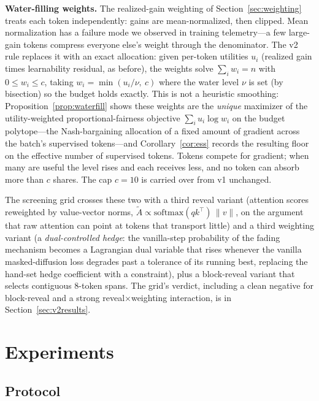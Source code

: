 \documentclass{article} %
\begin{document}
\textbf{Water-filling weights.} The realized-gain weighting of Section~\ref{sec:weighting} treats each token independently: gains are mean-normalized, then clipped. Mean normalization has a failure mode we observed in training telemetry---a few large-gain tokens compress everyone else's weight through the denominator. The v2 rule replaces it with an exact allocation: given per-token utilities $u_i$ (realized gain times learnability residual, as before), the weights solve $\sum_i w_i = n$ with $0 \le w_i \le c$, taking $w_i = \min(u_i/\nu,\ c)$ where the water level $\nu$ is set (by bisection) so the budget holds exactly. This is not a heuristic smoothing: Proposition~\ref{prop:waterfill} shows these weights are the \emph{unique} maximizer of the utility-weighted proportional-fairness objective $\sum_i u_i \log w_i$ on the budget polytope---the Nash-bargaining allocation of a fixed amount of gradient across the batch's supervised tokens---and Corollary~\ref{cor:ess} records the resulting floor on the effective number of supervised tokens. Tokens compete for gradient; when many are useful the level rises and each receives less, and no token can absorb more than $c$ shares. The cap $c{=}10$ is carried over from v1 unchanged.

The screening grid crosses these two with a third reveal variant (attention scores reweighted by value-vector norms, $\tilde A \propto \mathrm{softmax}(qk^\top)\,\lVert v\rVert$, on the argument that raw attention can point at tokens that transport little) and a third weighting variant (a \emph{dual-controlled hedge}: the vanilla-step probability of the fading mechanism becomes a Lagrangian dual variable that rises whenever the vanilla masked-diffusion loss degrades past a tolerance of its running best, replacing the hand-set hedge coefficient with a constraint), plus a block-reveal variant that selects contiguous 8-token spans. The grid's verdict, including a clean negative for block-reveal and a strong reveal$\times$weighting interaction, is in Section~\ref{sec:v2results}.

\section{Experiments}
\label{sec:experiments}

\subsection{Protocol}
\end{document}
